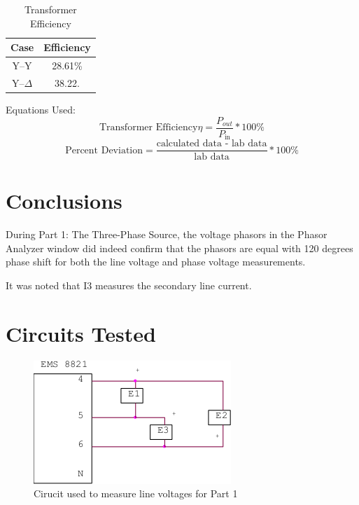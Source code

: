 \documentclass{article}
\begin{document}
\begin{table}[H]
  \centering
  \begin{tabular}{*{2}{c}}
    \textbf{Case} & \textbf{Efficiency} \\

    \hline

    Y--Y        & 28.61\% \\
    Y--$\Delta$ & 38.22. \\
  \end{tabular}
  \caption{Transformer Efficiency}
  \label{tab:efficiency}
\end{table}



Equations Used:
\[\text{Transformer Efficiency}\eta = \frac{P_{out}}{P_\text{in}} * 100\% \]
\[\text{Percent Deviation} = \frac{\text{calculated data - lab data}}{\text{lab data}} * 100\%\]

\section{Conclusions}
During Part 1: The Three-Phase Source, the voltage phasors in the Phasor Analyzer window did
indeed confirm that the phasors are equal with 120 degrees phase shift for both the line voltage
and phase voltage measurements.

It was noted that I3 measures the secondary line current.

\section*{Circuits Tested}
\begin{figure}[H]
  \centering
  \includegraphics[width=.8\textwidth]{img/circuit_01}
  \caption{Cirucit used to measure line voltages for Part 1}
  \label{fig:circuit_01}
\end{figure}
\end{document}

